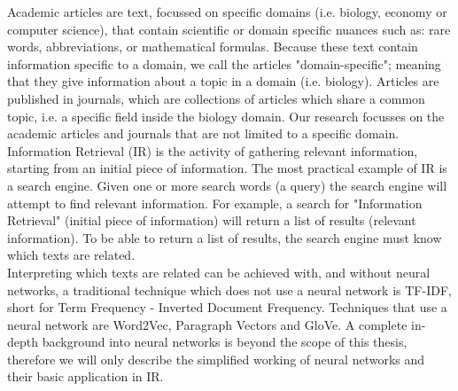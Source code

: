 \documentclass[../../Thesis.tex]{subfiles}
\begin{document}
Academic articles are text, focussed on specific domains (i.e. biology, economy or computer science), that contain scientific or domain specific nuances such as: rare words, abbreviations, or mathematical formulas. Because these text contain information specific to a domain, we call the articles "domain-specific"; meaning that they give information about a topic in a domain (i.e. biology). Articles are published in journals, which are collections of articles which share a common topic, i.e. a specific field inside the biology domain. Our research focusses on the academic articles and journals that are not limited to a specific domain.
Information Retrieval (IR) is the activity of gathering relevant information, starting from an initial piece of information.  The most practical example of IR is a search engine. Given one or more search words (a query) the search engine will attempt to find relevant information. For example, a search for "Information Retrieval" (initial piece of information) will return a list of results (relevant information). To be able to return a list of results, the search engine must know which texts are related. \\Interpreting which texts are related can be achieved with, and without neural networks, a traditional technique which does not use a neural network is TF-IDF, short for Term Frequency - Inverted Document Frequency. Techniques that use a neural network are Word2Vec, Paragraph Vectors and GloVe.
A complete in-depth background into neural networks is beyond the scope of this thesis, therefore we will only describe the simplified working of neural networks and their basic application in IR.
\end{document}

